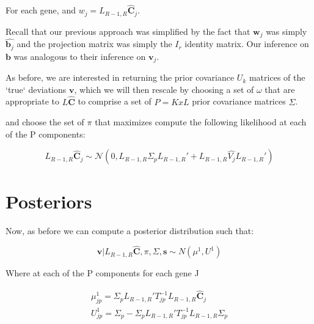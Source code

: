 \documentclass[11pt, oneside]{article}   	%
\newcommand{\Norm}{{\mathcal{N}}} %
\newcommand{\chat}{\bm{\hat{C}}}
\newcommand{\vb}{\bm{v}}
\begin{document}
\begin{itemize}
For each gene, and $w_{j} = L_{R-1,R} \chat_{j}$.

Recall that our previous approach was simplified by the fact that $\bm{w}_{j}$ was simply $\hat{\bm{b}_{j}}$ and the projection matrix was simply the $I_{r}$ identity matrix. Our inference on $\bm{b}$ was analogous to their inference on $\vb_{j}$. 


As before, we are interested in returning the prior covariance $U_k$ matrices of the `true` deviations $\vb$, which we will then rescale by choosing a set of $\omega$ that are appropriate to $L \chat $ to comprise a set of $P = KxL$ prior covariance matrices $\Sigma$.

and choose the set of $\pi$ that maximizes compute the following likelihood at each of the P components: 

\begin{equation}
L_{R-1,R}  \chat _j \sim \Norm (0, L_{R-1,R}  \Sigma_{p} L_{R-1,R} ' + L_{R-1,R} \hat{V_j} L_{R-1,R} ') 
\end{equation}
 

\section{Posteriors}

Now, as before we can compute a posterior distribution such that:

\begin{equation}
\vb | L_{R-1,R}  \chat, \pi, \Sigma, \bm{s} \sim N(\mu^{1} , U^{1})
\end{equation}

Where at each of the P components for each gene J 

\begin{equation}
\begin{aligned}
\mu^{1}_{jp} = \Sigma_{p} L_{R-1,R} ' T_{jp}^{-1} L_{R-1,R}  \chat_{j} \\
U^{1}_{jp} = \Sigma_{p} - \Sigma_p L_{R-1,R} ' T_{jp}^{-1} L_{R-1,R}  \Sigma_{p}
\end{aligned}
\end{equation}


\end{itemize}
\end{document}
